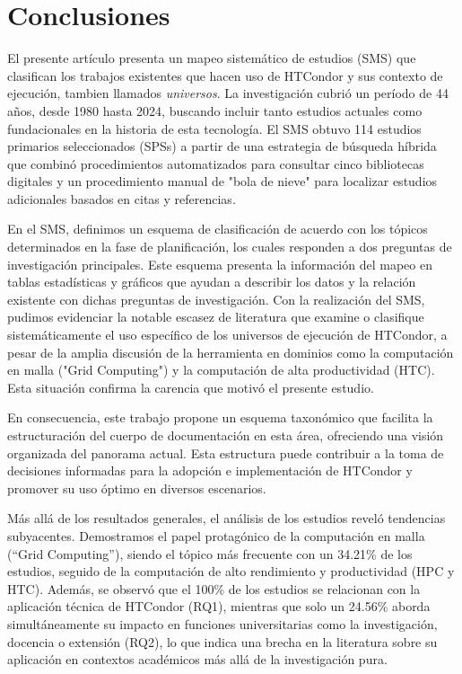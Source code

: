 \section{Conclusiones}\label{sec:conclusiones}


El presente artículo presenta un mapeo sistemático de estudios (SMS) que clasifican los trabajos existentes que hacen uso de HTCondor y sus contexto de ejecución, tambien llamados \textit{universos}. La investigación cubrió un período de 44 años, desde 1980 hasta 2024, buscando incluir tanto estudios actuales como fundacionales en la historia de esta tecnología. El SMS obtuvo 114 estudios primarios seleccionados (SPSs) a partir de una estrategia de búsqueda híbrida que combinó procedimientos automatizados para consultar cinco bibliotecas digitales y un procedimiento manual de "bola de nieve" para localizar estudios adicionales basados en citas y referencias.

En el SMS, definimos un esquema de clasificación de acuerdo con los tópicos determinados en la fase de planificación, los cuales responden a dos preguntas de investigación principales. Este esquema presenta la información del mapeo en tablas estadísticas y gráficos que ayudan a describir los datos y la relación existente con dichas preguntas de investigación. Con la realización del SMS, pudimos evidenciar la notable escasez de literatura que examine o clasifique sistemáticamente el uso específico de los universos de ejecución de HTCondor, a pesar de la amplia discusión de la herramienta en dominios como la computación en malla ("Grid Computing") y la computación de alta productividad (HTC). Esta situación confirma la carencia que motivó el presente estudio.

En consecuencia, este trabajo propone un esquema taxonómico que facilita la estructuración del cuerpo de documentación en esta área, ofreciendo una visión organizada del panorama actual. Esta estructura puede contribuir a la toma de decisiones informadas para la adopción e implementación de HTCondor y promover su uso óptimo en diversos escenarios.

Más allá de los resultados generales, el análisis de los estudios reveló tendencias subyacentes. Demostramos el papel protagónico de la computación en malla (``Grid Computing''), siendo el tópico más frecuente con un 34.21\% de los estudios, seguido de la computación de alto rendimiento y productividad (HPC y HTC). Además, se observó que el 100\% de los estudios se relacionan con la aplicación técnica de HTCondor (RQ1), mientras que solo un 24.56\% aborda simultáneamente su impacto en funciones universitarias como la investigación, docencia o extensión (RQ2), lo que indica una brecha en la literatura sobre su aplicación en contextos académicos más allá de la investigación pura.

